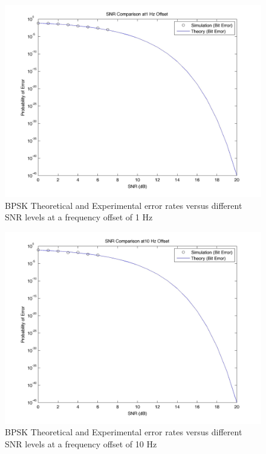 \documentclass[]{article}
\begin{document}
\begin{figure}[H]
\centering
\hspace*{-2cm}\includegraphics[width=1.3\textwidth]{bpSNRfo3.jpg}
\caption{BPSK Theoretical and Experimental error rates versus different SNR levels at a frequency offset of 1 Hz}
\end{figure}

\begin{figure}[H]
\centering
\hspace*{-2cm}\includegraphics[width=1.3\textwidth]{bpSNRfo4.jpg}
\caption{BPSK Theoretical and Experimental error rates versus different SNR levels at a frequency offset of 10 Hz}
\end{figure}
\end{document}

